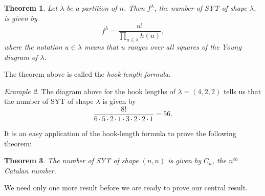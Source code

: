 \documentclass[11pt,letterpaper,twoside,english]{article}
\theoremstyle{theorem}
\newtheorem{theorem}{Theorem}[section]
\theoremstyle{remark}
\newtheorem{example}[theorem]{Example}
\begin{document}
\begin{theorem}
Let $\lambda$ be a partition of $n$. Then $f^\lambda$, the number of SYT of shape $\lambda$, is given by
\[f^\lambda=\frac{n!}{\prod_{u\in \lambda} h(u)},\]
where the notation $u\in \lambda$ means that $u$ ranges over all squares of the Young diagram of $\lambda$.
\end{theorem}

The theorem above is called the \emph{hook-length formula}.

\begin{example}
The diagram above for the hook lengths of $\lambda=(4, 2, 2)$ tells us that the number of SYT of shape $\lambda$ is given by
\[\frac{8!}{6\cdot 5\cdot 2 \cdot 1 \cdot 3 \cdot 2 \cdot 2\cdot 1}=56.\]
\end{example}

It is an easy application of the hook-length formula to prove the following theorem:

\begin{theorem}
\label{catalan_2}
The number of SYT of shape $(n, n)$ is given by $C_n$, the $n^{th}$ Catalan number.
\end{theorem}

We need only one more result before we are ready to prove our central result.
\end{document}
